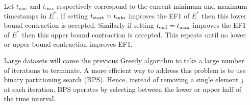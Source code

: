  Let $t_{\min}$ and $t_{\max}$ respectively correspond to the current minimum and maximum timestamps in $E^*$.  If setting $t_{\textrm{start}} = t_{\min}$ improves the EF1 of $E^*$ then this lower bound contraction is accepted.  Similarly if setting $t_{\textrm{end}} = t_{\max}$ improves the EF1 of $E^*$ then this upper bound contraction is accepted.  This repeats until no lower or upper bound contraction improves EF1. 

 Large datasets will cause the previous Greedy algorithm to take a large number of iterations to terminate.  A more efficient way to address this problem is to use binary partitioning search (BPS).  Hence, instead of removing a single element $j$ at each iteration, BPS operates by selecting between the lower or upper half of the time interval. 









